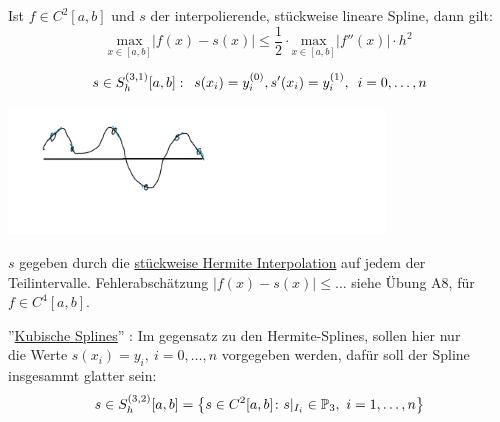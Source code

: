 \begin{corollary}
    Ist $f\in C^2[a,b]$ und $s$ der interpolierende, stückweise lineare Spline, dann gilt:\[
    \underset{x\in [a,b]}{\text{max}} |f(x)-s(x)| \leq \frac{1}{2}\cdot \underset{x\in [a,b]}{\text{max}}|f''(x)|\cdot h^2
    \]
\end{corollary}
\begin{example}
    \[s\in S_h^{(3,1)}[a,b]: \hspace{.5em} s(x_i) = y_i^{(0)}, s'(x_i)=y_i^{(1)}, \hspace{.5em} i=0,\dots,n\]
    \begin{center}
        \includegraphics[width=100mm]{Bilder/161122_1.png}
    \end{center}
    $s$ gegeben durch die \underline{stückweise Hermite Interpolation} auf jedem der Teilintervalle.
    Fehlerabschätzung $|f(x)-s(x)|\leq \dots$ siehe Übung A8, für $f\in C^4[a,b]$.\\
\end{example}
''\underline{Kubische Splines}'' : Im gegensatz zu den Hermite-Splines, sollen hier nur \\ die Werte $s(x_i)=y_i,\ 
i=0,\dots, n$ 
vorgegeben werden, dafür soll der Spline insgesammt glatter sein:\[
s\in S_h^{(3,2)}[a,b]=\left\{s\in C^2[a,b]\colon s\vert_{I_i}\in \mathbb{P}_3 , \ i=1,\dots, n\right\}\]
